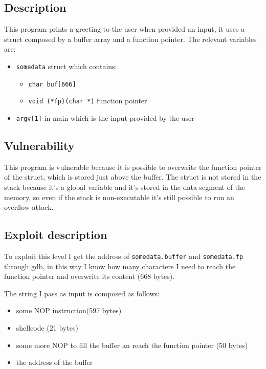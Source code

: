 \documentclass[a4paper,12pt]{article}
\begin{document}
\subsection{Description}

This program prints a greeting to the user when provided an input, it uses a struct composed by a buffer array and a function pointer. The relevant variables are:
\begin{itemize}

\item \texttt{somedata} struct which contains:
		\begin{itemize}
		\item \texttt{char buf[666]}
		\item \texttt{void (*fp)(char *)} function pointer
		\end{itemize}
\item \texttt{argv[1]} in main which is the input provided by the user
\end{itemize}

\subsection{Vulnerability}

This program is vulnerable because it is possible to overwrite the function pointer of the struct, which is stored just above the buffer. The struct is not stored in the stack because it's a global variable and it's stored in the data segment of the memory, so even if the stack is non-executable it's still possible to run an overflow attack.


\subsection{Exploit description}

To exploit this level I get the address of \texttt{somedata.buffer} and \texttt{somedata.fp} through gdb, in this way I know how many characters I need to reach the function pointer and overwrite its content (668 bytes).

The string I pass as input is composed as follows:

\begin{itemize}
\item some NOP instruction(597 bytes)
\item shellcode (21 bytes)
\item some more NOP to fill the buffer an reach the function pointer (50 bytes)
\item the address of the buffer
\end{itemize}
\end{document}
